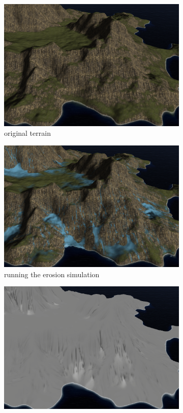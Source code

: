 \documentclass[journal, letterpaper]{IEEEtran}
\begin{document}
\begin{figure}
	\centering
	\begin{subfigure}[b]{0.45\textwidth}
		\includegraphics[width=\textwidth]{images/Erosion1}
		\caption{original terrain}
		\label{fig:erosion1}
	\end{subfigure}
	\begin{subfigure}[b]{0.45\textwidth}
		\includegraphics[width=\textwidth]{images/Erosion2}
		\caption{running the erosion simulation}
		\label{fig:erosion2}
	\end{subfigure}
	\begin{subfigure}[b]{0.45\textwidth}
		\includegraphics[width=\textwidth]{images/Erosion3}

\end{subfigure}
\end{figure}
\end{document}
